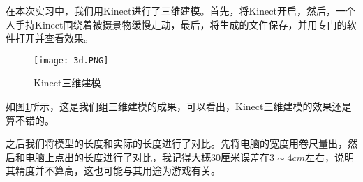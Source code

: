 在本次实习中，我们用Kinect进行了三维建模。首先，将Kinect开启，然后，一个人手持Kinect围绕着被摄景物缓慢走动，最后，将生成的文件保存，并用专门的软件打开并查看效果。

\begin{figure}[htbp]
\centering
\caption{Kinect三维建模}
\texttt{[image: 3d.PNG]}
\label{fig:3d}
\end{figure}

如图\ref{fig:3d}所示，这是我们组三维建模的成果，可以看出，Kinect三维建模的效果还是算不错的。

之后我们将模型的长度和实际的长度进行了对比。先将电脑的宽度用卷尺量出，然后和电脑上点出的长度进行了对比，我记得大概30厘米误差在$3\sim 4\si{cm}$左右，说明其精度并不算高，这也可能与其用途为游戏有关。

